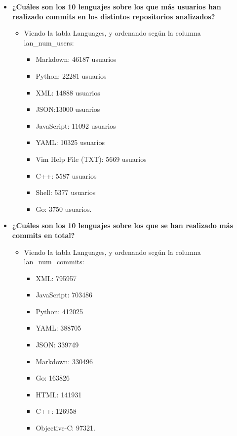 \documentclass[a4paper, 12pt]{book}
\begin{document}
\begin{itemize}
  \item \textbf{¿Cuáles son los 10 lenguajes sobre los que más usuarios han realizado commits en los distintos repositorios analizados?}
        \begin{itemize}
          \item Viendo la tabla Languages, y ordenando según la columna lan\_num\_users: 
          \begin{itemize}
            \item Markdown: 46187 usuarios
            \item Python: 22281 usuarios
            \item XML: 14888 usuarios
            \item JSON:13000 usuarios
            \item JavaScript: 11092 usuarios
            \item YAML: 10325 usuarios
            \item Vim Help File (TXT): 5669 usuarios
            \item C++: 5587 usuarios
            \item Shell: 5377 usuarios
            \item Go: 3750 usuarios.
          \end{itemize}
        \end{itemize}
  \item \textbf{¿Cuáles son los 10 lenguajes sobre los que se han realizado más commits en total?}
        \begin{itemize}
          \item Viendo la tabla Languages, y ordenando según la columna lan\_num\_commits:
          \begin{itemize}
            \item XML: 795957
            \item JavaScript: 703486
            \item Python: 412025
            \item YAML: 388705
            \item JSON: 339749
            \item Markdown: 330496
            \item Go: 163826
            \item HTML: 141931
            \item C++: 126958
            \item Objective-C: 97321.
          \end{itemize}

\end{itemize}
\end{itemize}
\end{document}
